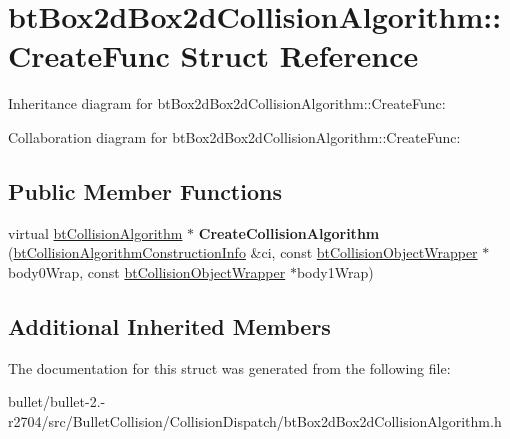 \hypertarget{structbt_box2d_box2d_collision_algorithm_1_1_create_func}{\section{bt\+Box2d\+Box2d\+Collision\+Algorithm\+:\+:Create\+Func Struct Reference}
\label{structbt_box2d_box2d_collision_algorithm_1_1_create_func}
}


Inheritance diagram for bt\+Box2d\+Box2d\+Collision\+Algorithm\+:\+:Create\+Func\+:


Collaboration diagram for bt\+Box2d\+Box2d\+Collision\+Algorithm\+:\+:Create\+Func\+:
\subsection*{Public Member Functions}
\begin{DoxyCompactItemize}
\item 
\hypertarget{structbt_box2d_box2d_collision_algorithm_1_1_create_func_a7321f4735c28b7fe137b140d67c230a2}{virtual \hyperlink{classbt_collision_algorithm}{bt\+Collision\+Algorithm} $\ast$ {\bfseries Create\+Collision\+Algorithm} (\hyperlink{structbt_collision_algorithm_construction_info}{bt\+Collision\+Algorithm\+Construction\+Info} \&ci, const \hyperlink{structbt_collision_object_wrapper}{bt\+Collision\+Object\+Wrapper} $\ast$body0\+Wrap, const \hyperlink{structbt_collision_object_wrapper}{bt\+Collision\+Object\+Wrapper} $\ast$body1\+Wrap)}\label{structbt_box2d_box2d_collision_algorithm_1_1_create_func_a7321f4735c28b7fe137b140d67c230a2}

\end{DoxyCompactItemize}
\subsection*{Additional Inherited Members}


The documentation for this struct was generated from the following file\+:\begin{DoxyCompactItemize}
\item 
bullet/bullet-\/2.-\/r2704/src/\+Bullet\+Collision/\+Collision\+Dispatch/bt\+Box2d\+Box2d\+Collision\+Algorithm.\+h\end{DoxyCompactItemize}
